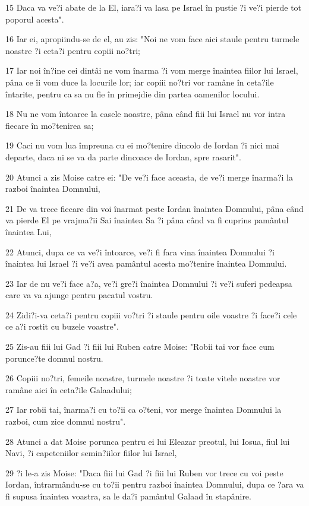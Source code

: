 \par 15 Daca va ve?i abate de la El, iara?i va lasa pe Israel în pustie ?i ve?i pierde tot poporul acesta".
\par 16 Iar ei, apropiindu-se de el, au zis: "Noi ne vom face aici staule pentru turmele noastre ?i ceta?i pentru copiii no?tri;
\par 17 Iar noi în?ine cei dintâi ne vom înarma ?i vom merge înaintea fiilor lui Israel, pâna ce îi vom duce la locurile lor; iar copiii no?tri vor ramâne în ceta?ile întarite, pentru ca sa nu fie în primejdie din partea oamenilor locului.
\par 18 Nu ne vom întoarce la casele noastre, pâna când fiii lui Israel nu vor intra fiecare în mo?tenirea sa;
\par 19 Caci nu vom lua împreuna cu ei mo?tenire dincolo de Iordan ?i nici mai departe, daca ni se va da parte dincoace de Iordan, spre rasarit".
\par 20 Atunci a zis Moise catre ei: "De ve?i face aceasta, de ve?i merge înarma?i la razboi înaintea Domnului,
\par 21 De va trece fiecare din voi înarmat peste Iordan înaintea Domnului, pâna când va pierde El pe vrajma?ii Sai înaintea Sa ?i pâna când va fi cuprins pamântul înaintea Lui,
\par 22 Atunci, dupa ce va ve?i întoarce, ve?i fi fara vina înaintea Domnului ?i înaintea lui Israel ?i ve?i avea pamântul acesta mo?tenire înaintea Domnului.
\par 23 Iar de nu ve?i face a?a, ve?i gre?i înaintea Domnului ?i ve?i suferi pedeapsa care va va ajunge pentru pacatul vostru.
\par 24 Zidi?i-va ceta?i pentru copiii vo?tri ?i staule pentru oile voastre ?i face?i cele ce a?i rostit cu buzele voastre".
\par 25 Zis-au fiii lui Gad ?i fiii lui Ruben catre Moise: "Robii tai vor face cum porunce?te domnul nostru.
\par 26 Copiii no?tri, femeile noastre, turmele noastre ?i toate vitele noastre vor ramâne aici în ceta?ile Galaadului;
\par 27 Iar robii tai, înarma?i cu to?ii ca o?teni, vor merge înaintea Domnului la razboi, cum zice domnul nostru".
\par 28 Atunci a dat Moise porunca pentru ei lui Eleazar preotul, lui Iosua, fiul lui Navi, ?i capeteniilor semin?iilor fiilor lui Israel,
\par 29 ?i le-a zis Moise: "Daca fiii lui Gad ?i fiii lui Ruben vor trece cu voi peste Iordan, întrarmându-se cu to?ii pentru razboi înaintea Domnului, dupa ce ?ara va fi supusa înaintea voastra, sa le da?i pamântul Galaad în stapânire.
